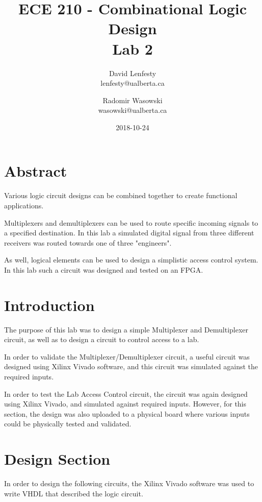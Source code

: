 \documentclass{article}
\title{ECE 210 - Combinational Logic Design \\
    Lab 2}
\date{2018-10-24}
\author{David Lenfesty \\ lenfesty@ualberta.ca
    \and Radomir Wasowski \\ wasowski@ualberta.ca}
\begin{document}
    \maketitle
    \newpage

    \doublespacing
    \tableofcontents
    \newpage


    \singlespacing

    \section{Abstract}

    Various logic circuit designs can be combined together to create
    functional applications.

    Multiplexers and demultiplexers can be used to route specific
    incoming signals to a specified destination. In this lab a simulated
    digital signal from three different receivers was routed towards
    one of three "engineers".
    
    As well, logical elements can be used to design a simplistic access control system.
    In this lab such a circuit was designed and tested on an FPGA.

    \section{Introduction}

    The purpose of this lab was to design a simple Multiplexer and Demultiplexer circuit,
    as well as to design a circuit to control access to a lab.

    In order to validate the Multiplexer/Demultiplexer circuit,
    a useful circuit was designed using Xilinx Vivado software,
    and this circuit was simulated against the required inputs.

    In order to test the Lab Access Control circuit, the circuit was again designed
    using Xilinx Vivado, and simulated against required inputs.
    However, for this section, the design was also uploaded to a physical board
    where various inputs could be physically tested and validated.

    \section{Design Section}

    In order to design the following circuits, the Xilinx Vivado software
    was used to write VHDL that described the logic circuit.
\end{document}

